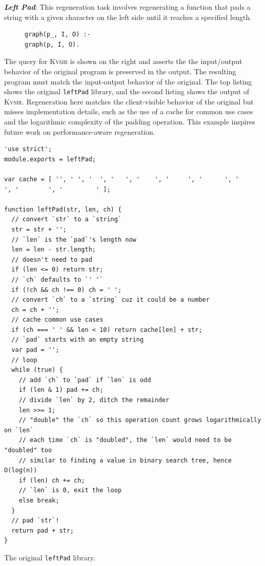 \documentclass[sigplan,review,anonymous,10pt]{acmart}
\newcommand{\sys}{{\scshape Kv{\textalpha}sir}\xspace}
\newcommand{\heading}[1]{\vspace{2pt}\noindent\textbf{\emph{#1}}:\enspace}
\newcommand{\ttt}[1]{\texttt{#1}\xspace}
\begin{document}
\heading{Left Pad}
This regeneration task involves regenerating a
function that pads a string with a given character on the left side until it
reaches a specified length.
\begin{figure}
\begin{verbatim}
graph(p_, I, O) :-
graph(p, I, O).
\end{verbatim}
\end{figure}
The query for \sys is shown on the right and asserts the the input/output behavior of the
original program is preserved in the output.
The resulting program must match the input-output behavior of the original.
The top listing shows the original \ttt{leftPad} library, and the second listing shows the output
of \sys.
Regeneration here matches the client-visible behavior of the original but misses
implementation details, such as the use of a cache for common
use cases and the logarithmic complexity of the padding operation.
This example inspires future work on performance-aware regeneration.

\begin{listing}[htpb]
\begin{verbatim}
'use strict';
module.exports = leftPad;

var cache = [ '', ' ', '  ', '   ', '    ', '     ', '      ', '       ', '        ', '         ' ];

function leftPad(str, len, ch) {
  // convert `str` to a `string`
  str = str + '';
  // `len` is the `pad`'s length now
  len = len - str.length;
  // doesn't need to pad
  if (len <= 0) return str;
  // `ch` defaults to `' '`
  if (!ch && ch !== 0) ch = ' ';
  // convert `ch` to a `string` cuz it could be a number
  ch = ch + '';
  // cache common use cases
  if (ch === ' ' && len < 10) return cache[len] + str;
  // `pad` starts with an empty string
  var pad = '';
  // loop
  while (true) {
    // add `ch` to `pad` if `len` is odd
    if (len & 1) pad += ch;
    // divide `len` by 2, ditch the remainder
    len >>= 1;
    // "double" the `ch` so this operation count grows logarithmically on `len`
    // each time `ch` is "doubled", the `len` would need to be "doubled" too
    // similar to finding a value in binary search tree, hence O(log(n))
    if (len) ch += ch;
    // `len` is 0, exit the loop
    else break;
  }
  // pad `str`!
  return pad + str;
}
  \end{verbatim}
\caption{The original \ttt{leftPad} library.}
\end{listing}
\end{document}
